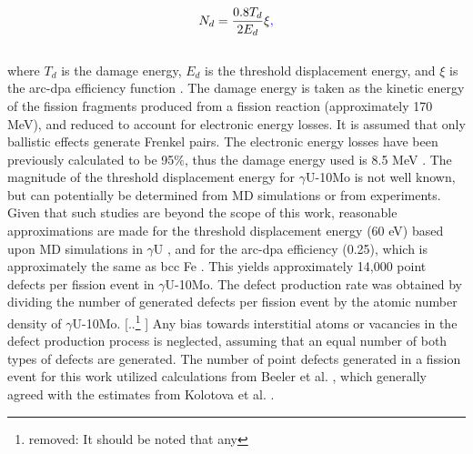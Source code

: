 \documentclass[preprint,12pt]{elsarticle}
\providecommand{\DIFadd}[1]{{\protect\color{blue} \sf #1}} %
\providecommand{\DIFdel}[1]{{\protect\color{red} [..\footnote{removed: #1} ]}} %
\providecommand{\DIFaddbegin}{} %
\providecommand{\DIFaddend}{} %
\providecommand{\DIFdelbegin}{} %
\providecommand{\DIFdelend}{} %
\newcommand{\DIFscaledelfig}{0.5}
\newlength{\DIFdelgraphicswidth} %
\newlength{\DIFdelgraphicsheight} %
\newcommand{\DIFaddincludegraphics}[2][]{{\color{blue}\fbox{\DIFOincludegraphics[#1]{#2}}}} %
\newcommand{\DIFdelincludegraphics}[2][]{%
\sbox{\DIFdelgraphicsbox}{\DIFOincludegraphics[#1]{#2}}%
\settoboxwidth{\DIFdelgraphicswidth}{\DIFdelgraphicsbox} %
\settoboxtotalheight{\DIFdelgraphicsheight}{\DIFdelgraphicsbox} %
\scalebox{\DIFscaledelfig}{%
\parbox[b]{\DIFdelgraphicswidth}{\usebox{\DIFdelgraphicsbox}\\[-\baselineskip] \rule{\DIFdelgraphicswidth}{0em}}\llap{\resizebox{\DIFdelgraphicswidth}{\DIFdelgraphicsheight}{%
\setlength{\unitlength}{\DIFdelgraphicswidth}%
\begin{picture}(1,1)%
\thicklines\linethickness{2pt} %
{\color[rgb]{1,0,0}\put(0,0){\framebox(1,1){}}}%
{\color[rgb]{1,0,0}\put(0,0){\line( 1,1){1}}}%
{\color[rgb]{1,0,0}\put(0,1){\line(1,-1){1}}}%
\end{picture}%
}\hspace*{3pt}}} %
} %
\DeclareRobustCommand{\DIFaddbegin}{\DIFOaddbegin \let\includegraphics\DIFaddincludegraphics} %
\DeclareRobustCommand{\DIFaddend}{\DIFOaddend \let\includegraphics\DIFOincludegraphics} %
\DeclareRobustCommand{\DIFdelbegin}{\DIFOdelbegin \let\includegraphics\DIFdelincludegraphics} %
\DeclareRobustCommand{\DIFdelend}{\DIFOaddend \let\includegraphics\DIFOincludegraphics} %
\begin{document}
\begin{equation}
N_{d} = \frac{0.8T_{d}}{2E_{d}}\xi\DIFaddbegin \DIFadd{,
}\DIFaddend \end{equation}
\\
\noindent where $T_{d}$ is the damage energy, $E_{d}$ is the threshold displacement energy, and $\xi$ is the arc-dpa efficiency function \cite{nordlund2018improving}. The damage energy is taken as the kinetic energy of the fission fragments produced from a fission reaction (approximately 170 MeV), and reduced to account for electronic energy losses. It is assumed that only ballistic effects generate Frenkel pairs. The electronic energy losses have been previously calculated to be 95$\%$, thus the damage energy used is 8.5 MeV \cite{beeler2021radiation}. The magnitude of the threshold displacement energy for $\gamma$U-10Mo is not well known, but can potentially be determined from MD simulations or from experiments. Given that such studies are beyond the scope of this work, reasonable approximations are made for the threshold displacement energy (60 eV) based upon MD simulations in $\gamma$U \cite{beeler2018calculation}, and for the arc-dpa efficiency (0.25), which is approximately the same as bcc Fe \cite{nordlund2018improving}. This yields approximately 14,000 point defects per fission event in $\gamma$U-10Mo. The defect production rate was obtained by dividing the number of generated defects per fission event by the atomic number density of $\gamma$U-10Mo. \DIFdelbegin \DIFdel{It should be noted that any }\DIFdelend \DIFaddbegin \DIFadd{Any }\DIFaddend bias towards interstitial atoms or vacancies in the defect production process is neglected, assuming that an equal number of both types of defects are generated. \DIFaddbegin \DIFadd{The number of point defects generated in a fission event for this work utilized calculations from Beeler et al. \cite{beeler2021radiation}, which generally agreed with the estimates from Kolotova et al. \cite{kolotova2019atomistic}. }\DIFaddend \\
\end{document}
